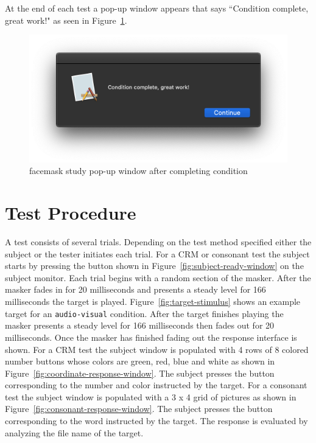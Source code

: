 \documentclass[11pt,pdftex,letterpaper]{article}
\begin{document}
At the end of each test a pop-up window appears that says ``Condition complete, great work!" as seen in Figure~\ref{fig:facemask-condition-complete}.
\begin{figure}
	\centering
	\includegraphics[width = 0.9\linewidth]{facemask-condition-complete.png}
	\caption{facemask study pop-up window after completing condition}
	\label{fig:facemask-condition-complete}
\end{figure}

\section{Test Procedure}
A test consists of several trials. Depending on the test method specified either the subject or the tester initiates each trial. For a CRM or consonant test the subject starts by pressing the button shown in Figure~\ref{fig:subject-ready-window} on the subject monitor. Each trial begins with a random section of the masker. After the masker fades in for 20 milliseconds and presents a steady level for 166 milliseconds the target is played. Figure~\ref{fig:target-stimulus} shows an example target for an \texttt{audio-visual} condition. After the target finishes playing the masker presents a steady level for 166 milliseconds then fades out for 20 milliseconds. Once the masker has finished fading out the response interface is shown. For a CRM test the subject window is populated with 4 rows of 8 colored number buttons whose colors are green, red, blue and white as shown in Figure~\ref{fig:coordinate-response-window}. The subject presses the button corresponding to the number and color instructed by the target. For a consonant test the subject window is populated with a 3 x 4 grid of pictures as shown in Figure~\ref{fig:consonant-response-window}. The subject presses the button corresponding to the word instructed by the target. The response is evaluated by analyzing the file name of the target.
\end{document}
